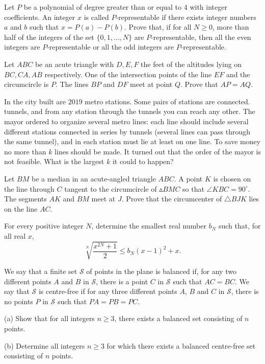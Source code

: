 \documentclass[11pt]{scrartcl}
\begin{document}
\begin{problem}[140536805208587401]
Let $P$ be a polynomial of degree greater than or equal to $4$ with integer coefficients. An integer $x$ is called $P$-representable if there exists integer numbers $a$ and $b$ such that $x = P(a) - P(b)$. Prove that, if for all $N \geq 0$, more than half of the integers of the set $\{0,1,\dots,N\}$ are $P$-representable, then all the even integers are $P$-representable or all the odd integers are $P$-representable.
\end{problem}
\begin{problem}[37302962546151]
Let $ABC$ be an acute triangle with $D, E, F$ the feet of the altitudes lying on $BC, CA, AB$ respectively. One of the intersection points of the line $EF$ and the circumcircle is $P.$ The lines $BP$ and $DF$ meet at point $Q.$ Prove that $AP = AQ.$
\end{problem}
\begin{problem}[175452544956824]
In the city built are $2019$ metro stations. Some pairs of stations are connected. tunnels, and from any station through the tunnels you can reach any other. The mayor ordered to organize several metro lines: each line should include several different stations connected in series by tunnels (several lines can pass through the same tunnel), and in each station must lie at least on one line. To save money no more than $k$ lines should be made. It turned out that the order of the mayor is not feasible. What is the largest $k$ it could to happen?
\end{problem}
\begin{problem}[1891712635906763103]
	Let $BM$ be a median in an acute-angled triangle $ABC$. A point $K$ is chosen on the line through $C$ tangent to the circumcircle of $\vartriangle BMC$ so that $\angle KBC = 90^\circ$. The segments $AK$ and $BM$ meet at $J$. Prove that the circumcenter of $\triangle BJK$ lies on the line $AC$.
\end{problem}
\begin{problem}[7500559455615129254]
For every positive integer $N$, determine the smallest real number $b_{N}$ such that, for all real $x$,
\[
\sqrt[N]{\frac{x^{2 N}+1}{2}} \leqslant b_{N}(x-1)^{2}+x .
\]
\end{problem}
\begin{problem}[8354552322611949357]
We say that a finite set $\mathcal{S}$ of points in the plane is balanced if, for any two different points $A$ and $B$ in $\mathcal{S}$, there is a point $C$ in $\mathcal{S}$ such that $AC=BC$. We say that $\mathcal{S}$ is centre-free if for any three different points $A$, $B$ and $C$ in $\mathcal{S}$, there is no points $P$ in $\mathcal{S}$ such that $PA=PB=PC$.

(a) Show that for all integers $n\ge 3$, there exists a balanced set consisting of $n$ points.

(b) Determine all integers $n\ge 3$ for which there exists a balanced centre-free set consisting of $n$ points.
\end{problem}
\end{document}
